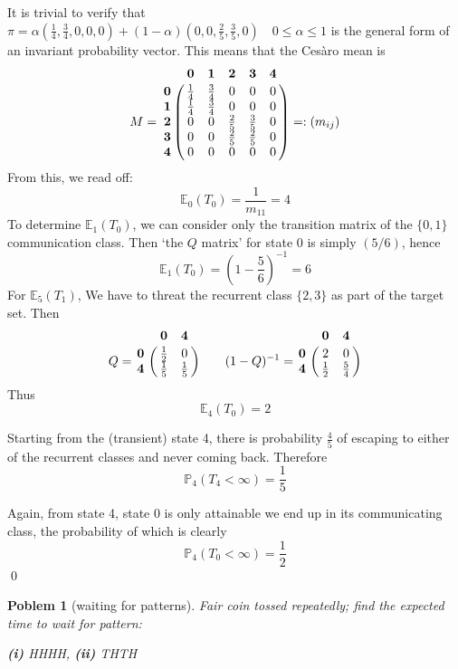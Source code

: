 \documentclass[8pt,notitlepage,twocolumn]{report}
\newtheorem{problem}{Poblem}
\newenvironment{solution}[1][Solution]{\begin{trivlist}
    \item[\hskip \labelsep {\bfseries #1}]}{\end{trivlist}}
\begin{document}
\begin{solution}
It is trivial to verify that 
$\pi = \alpha (\frac{1}{4},\frac{3}{4},0,0,0) + (1-\alpha)(0,0,\frac{2}{5},\frac{3}{5},0) 
	\quad 0\leq\alpha\leq1$ 
is the general form of an invariant probability vector.
This means that the Ces\`aro mean is
\begin{equation}
  M = \bordermatrix{
	& \mathbf{0} & \mathbf{1} & \mathbf{2} & \mathbf{3} & \mathbf{4} 	\cr
\mathbf{0} & \frac{1}{4} & \frac{3}{4} & 0 & 0 & 0		\cr
\mathbf{1} & \frac{1}{4} & \frac{3}{4} & 0 & 0 & 0		\cr
\mathbf{2} & 0 & 0 & \frac{2}{5} & \frac{3}{5} & 0		\cr
\mathbf{3} & 0 & 0 & \frac{2}{5} & \frac{2}{5} & 0		\cr
\mathbf{4} & 0 & 0 & 0 & 0 & 0
}
=: (m_{ij})
\end{equation}
From this, we read off:
$$
\mathbb{E}_0(T_0) = \frac{1}{m_{11}} = 4
$$
To determine $\mathbb{E}_1(T_0)$, we can consider only the transition matrix of the
$\{0,1\}$ communication class. Then `the $Q$ matrix' for state $0$ is simply $(5/6)$, 
hence
$$
\mathbb{E}_1(T_0) = (1-\frac{5}{6})^{-1} = 6
$$
For $\mathbb{E}_5(T_1)$, We have to threat the recurrent class $\{2,3\}$ as part of the target set.
Then 
\scriptsize
$$
Q = \bordermatrix{
	& \mathbf{0} & \mathbf{4}	\cr
\mathbf{0} & \frac{1}{2} & 0		\cr
\mathbf{4} & \frac{1}{5} & \frac{1}{5}
} \qquad
(1-Q)^{-1} = \bordermatrix{
	& \mathbf{0} & \mathbf{4}	\cr
\mathbf{0} & 2 & 0		\cr
\mathbf{4} & \frac{1}{2} & \frac{5}{4}
}	
$$
\normalsize
Thus $$ \mathbb{E}_4(T_0) = 2 $$

Starting from the (transient) state 4, there is probability $\frac{4}{5}$ 
of escaping to either of the recurrent classes and never coming back. Therefore
$$
	\mathbb{P}_4(T_4<\infty) = \frac{1}{5}
$$

Again, from state 4, state 0 is only attainable we end up in its communicating class, 
the probability of which is clearly
$$
	\mathbb{P}_4(T_0<\infty) = \frac{1}{2}
$$
\qed
\end{solution}

\begin{problem}[waiting for patterns]
Fair coin tossed repeatedly; find the expected time to wait for pattern:

{\bf (i)} {HHHH}, {\bf (ii)} {THTH}
\end{problem}
\end{document}
